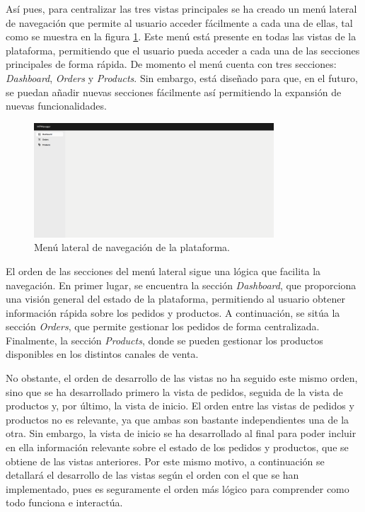 Así pues, para centralizar las tres vistas principales se ha creado un menú lateral de navegación que permite al usuario acceder fácilmente a cada una de ellas, tal como se muestra en la figura \ref{fig:dev:ss:menu_lateral}. Este menú está presente en todas las vistas de la plataforma, permitiendo que el usuario pueda acceder a cada una de las secciones principales de forma rápida. De momento el menú cuenta con tres secciones: \textit{Dashboard}, \textit{Orders} y \textit{Products}. Sin embargo, está diseñado para que, en el futuro, se puedan añadir nuevas secciones fácilmente así permitiendo la expansión de nuevas funcionalidades.

\begin{figure}[H]
    \centering
    \includegraphics[width=0.8\textwidth]{figures/design_develop/screenshots/menu_lateral.png}
    \caption{Menú lateral de navegación de la plataforma.}
    \label{fig:dev:ss:menu_lateral}
\end{figure}

El orden de las secciones del menú lateral sigue una lógica que facilita la navegación. En primer lugar, se encuentra la sección \textit{Dashboard}, que proporciona una visión general del estado de la plataforma, permitiendo al usuario obtener información rápida sobre los pedidos y productos. A continuación, se sitúa la sección \textit{Orders}, que permite gestionar los pedidos de forma centralizada. Finalmente, la sección \textit{Products}, donde se pueden gestionar los productos disponibles en los distintos canales de venta.

No obstante, el orden de desarrollo de las vistas no ha seguido este mismo orden, sino que se ha desarrollado primero la vista de pedidos, seguida de la vista de productos y, por último, la vista de inicio. El orden entre las vistas de pedidos y productos no es relevante, ya que ambas son bastante independientes una de la otra. Sin embargo, la vista de inicio se ha desarrollado al final para poder incluir en ella información relevante sobre el estado de los pedidos y productos, que se obtiene de las vistas anteriores. Por este mismo motivo, a continuación se detallará el desarrollo de las vistas según el orden con el que se han implementado, pues es seguramente el orden más lógico para comprender como todo funciona e interactúa.

